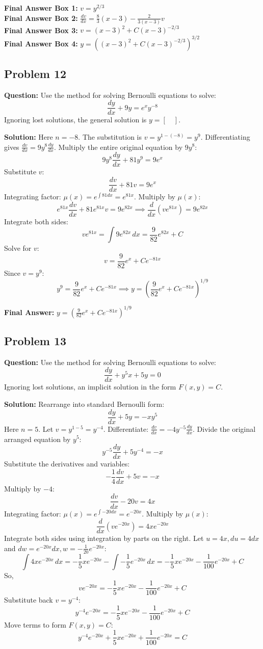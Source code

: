 \documentclass[11pt]{article}
\begin{document}
\textbf{Final Answer Box 1:} $v = y^{2/3}$ \\
\textbf{Final Answer Box 2:} $\frac{dv}{dx} = \frac{8}{3}(x-3) - \frac{2}{3(x-3)}v$ \\
\textbf{Final Answer Box 3:} $v = (x-3)^2 + C(x-3)^{-2/3}$ \\
\textbf{Final Answer Box 4:} $y = \left((x-3)^2 + C(x-3)^{-2/3}\right)^{3/2}$

\vspace{0.5cm}
\subsection*{Problem 12}
\textbf{Question:} Use the method for solving Bernoulli equations to solve:
\[ \frac{dy}{dx} + 9y = e^x y^{-8} \]
Ignoring lost solutions, the general solution is $y = [\quad]$.

\textbf{Solution:}
Here $n = -8$. The substitution is $v = y^{1 - (-8)} = y^9$.
Differentiating gives $\frac{dv}{dx} = 9y^8 \frac{dy}{dx}$.
Multiply the entire original equation by $9y^8$:
\[ 9y^8\frac{dy}{dx} + 81y^9 = 9e^x \]
Substitute $v$:
\[ \frac{dv}{dx} + 81v = 9e^x \]
Integrating factor: $\mu(x) = e^{\int 81 dx} = e^{81x}$.
Multiply by $\mu(x)$:
\[ e^{81x}\frac{dv}{dx} + 81e^{81x}v = 9e^{82x} \implies \frac{d}{dx}(v e^{81x}) = 9e^{82x} \]
Integrate both sides:
\[ v e^{81x} = \int 9e^{82x} \, dx = \frac{9}{82}e^{82x} + C \]
Solve for $v$:
\[ v = \frac{9}{82}e^x + Ce^{-81x} \]
Since $v = y^9$:
\[ y^9 = \frac{9}{82}e^x + Ce^{-81x} \implies y = \left(\frac{9}{82}e^x + Ce^{-81x}\right)^{1/9} \]

\textbf{Final Answer:} $y = \left(\frac{9}{82}e^x + Ce^{-81x}\right)^{1/9}$

\vspace{0.5cm}
\subsection*{Problem 13}
\textbf{Question:} Use the method for solving Bernoulli equations to solve:
\[ \frac{dy}{dx} + y^5 x + 5y = 0 \]
Ignoring lost solutions, an implicit solution in the form $F(x,y) = C$.

\textbf{Solution:}
Rearrange into standard Bernoulli form:
\[ \frac{dy}{dx} + 5y = -x y^5 \]
Here $n = 5$. Let $v = y^{1-5} = y^{-4}$.
Differentiate: $\frac{dv}{dx} = -4y^{-5}\frac{dy}{dx}$.
Divide the original arranged equation by $y^5$:
\[ y^{-5}\frac{dy}{dx} + 5y^{-4} = -x \]
Substitute the derivatives and variables:
\[ -\frac{1}{4}\frac{dv}{dx} + 5v = -x \]
Multiply by $-4$:
\[ \frac{dv}{dx} - 20v = 4x \]
Integrating factor: $\mu(x) = e^{\int -20 dx} = e^{-20x}$.
Multiply by $\mu(x)$:
\[ \frac{d}{dx}(v e^{-20x}) = 4xe^{-20x} \]
Integrate both sides using integration by parts on the right. Let $u = 4x, du = 4dx$ and $dw = e^{-20x}dx, w = -\frac{1}{20}e^{-20x}$:
\[ \int 4xe^{-20x} \, dx = -\frac{1}{5}xe^{-20x} - \int -\frac{1}{5}e^{-20x} \, dx = -\frac{1}{5}xe^{-20x} - \frac{1}{100}e^{-20x} + C \]
So,
\[ v e^{-20x} = -\frac{1}{5}xe^{-20x} - \frac{1}{100}e^{-20x} + C \]
Substitute back $v = y^{-4}$:
\[ y^{-4} e^{-20x} = -\frac{1}{5}xe^{-20x} - \frac{1}{100}e^{-20x} + C \]
Move terms to form $F(x,y) = C$:
\[ y^{-4} e^{-20x} + \frac{1}{5}xe^{-20x} + \frac{1}{100}e^{-20x} = C \]
\end{document}
